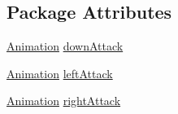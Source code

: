 \subsection*{Package Attributes}
\begin{DoxyCompactItemize}
\item 
\mbox{\hyperlink{classorg_1_1newdawn_1_1slick_1_1_animation}{Animation}} \mbox{\hyperlink{classentities_1_1_subject_a5b0e607cea5f2a64d7e7f53035995b7b}{down\+Attack}}
\item 
\mbox{\hyperlink{classorg_1_1newdawn_1_1slick_1_1_animation}{Animation}} \mbox{\hyperlink{classentities_1_1_subject_ab40f0af736007eb0a7ba1ee89765225a}{left\+Attack}}
\item 
\mbox{\hyperlink{classorg_1_1newdawn_1_1slick_1_1_animation}{Animation}} \mbox{\hyperlink{classentities_1_1_subject_aab2192306daae64078eba6d19699bcf0}{right\+Attack}}
\end{DoxyCompactItemize}
